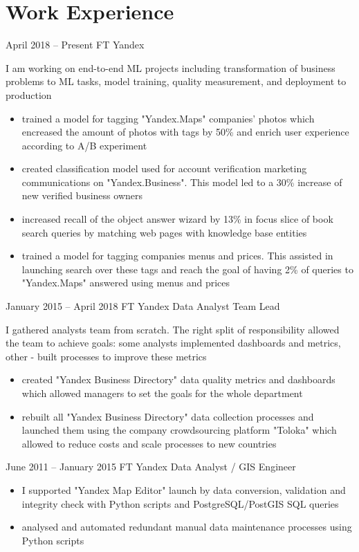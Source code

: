 \section{Work Experience}

\jobentry
    {April 2018 -- Present}
    {FT}
    {Yandex}
    {\currentPosition}
    {
        I am working on end-to-end ML projects including transformation of business problems to ML tasks, model training, quality measurement, and deployment to production
        \begin{itemize}
            \item trained a model for tagging "Yandex.Maps" companies' photos which encreased the amount of photos with tags by 50\% and enrich user experience according to A/B experiment
            \item created classification model used for account verification marketing communications on "Yandex.Business". This model led to a 30\% increase of new verified business owners
            \item increased recall of the object answer wizard by 13\% in focus slice of book search queries by matching web pages with knowledge base entities
            \item trained a model for tagging companies menus and prices. This assisted in launching search over these tags and reach the goal of having 2\% of queries to "Yandex.Maps" answered using menus and prices
        \end{itemize}
    }

\hrulefill

\jobentry
    {January 2015 -- April 2018}
    {FT}
    {Yandex}
    {Data Analyst Team Lead}
    {
        I gathered analysts team from scratch. The right split of responsibility allowed the team to achieve goals: some analysts implemented dashboards and metrics, other - built processes to improve these metrics
        \begin{itemize}
            \item created "Yandex Business Directory" data quality metrics and dashboards which allowed managers to set the goals for the whole department
            \item rebuilt all "Yandex Business Directory" data collection processes and launched them using the company crowdsourcing platform "Toloka" which allowed to reduce costs and scale processes to new countries
        \end{itemize}
    }

\hrulefill

\jobentry
    {June 2011 -- January 2015}
    {FT}
    {Yandex}
    {Data Analyst / GIS Engineer}
    {
        \begin{itemize}[topsep=0pt]
            \item I supported "Yandex Map Editor" launch by data conversion, validation and integrity check with Python scripts and PostgreSQL/PostGIS SQL queries
            \item analysed and automated redundant manual data maintenance processes using Python scripts
        \end{itemize}
    }
